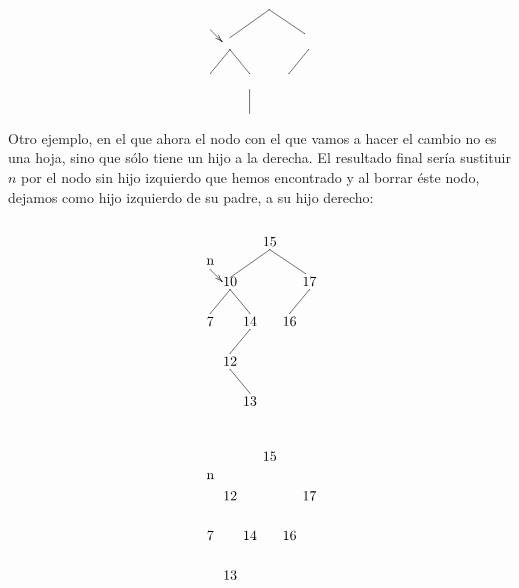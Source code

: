 \documentclass[10pt,a4paper,spanish]{report}
\begin{document}
\begin{description}
\begin{enumerate}[a)]
\begin{minipage}{0.6\textwidth}
\[\begin{xy}
\ar@{->} (-15,-7);(-12,-10)
\ar@{-} (0,-2);(-10,-9) %
\ar@{-} (0,-2);(9,-8) %
\ar@{-} (-10,-12);(-15,-18) %
\ar@{-} (10,-12);(5,-18) %
\ar@{-} (-10,-12);(-5,-18) %
\ar@{-} (-5,-22);(-5,-28) %
\end{xy}\]
\end{minipage}

\noindent
Otro ejemplo, en el que ahora el nodo con el que vamos a hacer el cambio no es una hoja, sino que sólo tiene un hijo a la derecha. El resultado final sería sustituir $n$ por el nodo sin hijo izquierdo que hemos encontrado y al borrar éste nodo, dejamos como hijo izquierdo de su padre, a su hijo derecho:

\begin{minipage}{0.6\textwidth}
\[\begin{xy}
,(0,0)*+=<10mm>[]\txt<2cm>{15}
,(-15,-5)*+=<10mm>[]\txt<2cm>{n}
,(-10,-10)*+=<10mm>[]\txt<2cm>{10}
,(10,-10)*+=<10mm>[]\txt<2cm>{17}
,(-15,-20)*+=<10mm>[]\txt<2cm>{7}
,(-5,-20)*+=<10mm>[]\txt<2cm>{14}
,(5,-20)*+=<10mm>[]\txt<2cm>{16}
,(-10,-30)*+=<10mm>[]\txt<2cm>{12}
,(-5,-40)*+=<10mm>[]\txt<2cm>{13}

\ar@{->} (-15,-7);(-12,-10)
\ar@{-} (0,-2);(-10,-9) %
\ar@{-} (0,-2);(9,-8) %
\ar@{-} (-10,-12);(-15,-18) %
\ar@{-} (10,-12);(5,-18) %
\ar@{-} (-10,-12);(-5,-18) %
\ar@{-} (-5,-22);(-10,-28) %
\ar@{-} (-10,-32);(-5,-38) %
\end{xy}\]
\end{minipage}
\begin{minipage}{0.6\textwidth}
\[\begin{xy}
,(0,0)*+=<10mm>[]\txt<2cm>{15}
,(-15,-5)*+=<10mm>[]\txt<2cm>{n}
,(-10,-10)*+=<10mm>[]\txt<2cm>{12}
,(10,-10)*+=<10mm>[]\txt<2cm>{17}
,(-15,-20)*+=<10mm>[]\txt<2cm>{7}
,(-5,-20)*+=<10mm>[]\txt<2cm>{14}
,(5,-20)*+=<10mm>[]\txt<2cm>{16}
,(-10,-30)*+=<10mm>[]\txt<2cm>{13}


\end{xy}\]
\end{minipage}
\end{enumerate}
\end{description}
\end{document}
